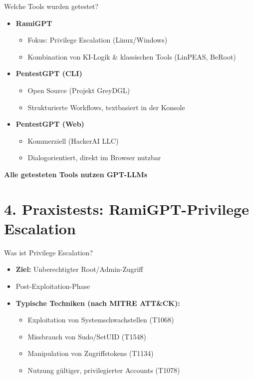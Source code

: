 \documentclass[
	aspectratio=169,	%
	onlytextwidth,		%
	t,					%
	]{beamer}
\begin{document}
\begin{frame}{Welche Tools wurden getestet?}
	
	\begin{itemize}
		\item \textbf{RamiGPT}
		\begin{itemize}
			\item Fokus: Privilege Escalation (Linux/Windows)
			\item Kombination von KI-Logik \& klassischen Tools (LinPEAS, BeRoot)
		\end{itemize}
		
		\item \textbf{PentestGPT (CLI)}
		\begin{itemize}
			\item Open Source (Projekt GreyDGL)
			\item Strukturierte Workflows, textbasiert in der Konsole
		\end{itemize}
		
		\item \textbf{PentestGPT (Web)}
		\begin{itemize}
			\item Kommerziell (HackerAI LLC)
			\item Dialogorientiert, direkt im Browser nutzbar
		\end{itemize}
	\end{itemize}
	\textbf{Alle getesteten Tools nutzen GPT-LLMs}
	
\end{frame}



\section{4. Praxistests: RamiGPT-Privilege Escalation}
\begin{frame}{Was ist Privilege Escalation?}
	\begin{itemize}
		\item \textbf{Ziel:} Unberechtigter Root/Admin-Zugriff
		\item Post-Exploitation-Phase
		\vspace{2mm}
		\item \textbf{Typische Techniken (nach MITRE ATT\&CK):}
		\begin{itemize}
			\item Exploitation von Systemschwachstellen (T1068)
			\item Missbrauch von Sudo/SetUID (T1548)
			\item Manipulation von Zugriffstokens (T1134)
			\item Nutzung gültiger, privilegierter Accounts (T1078)
		\end{itemize}
	\end{itemize}
\end{frame}
\end{document}
